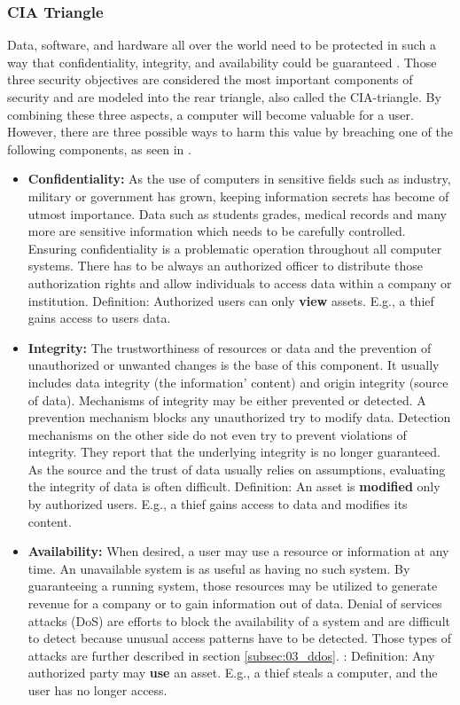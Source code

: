 \subsubsection{CIA Triangle}
Data, software, and hardware all over the world need to be protected in such a way that confidentiality, integrity, and availability could be guaranteed \cite{Pfleeger2014}. Those three security objectives are considered the most important components of security and are modeled into the rear triangle, also called the CIA-triangle. By combining these three aspects, a computer will become valuable for a user. However, there are three possible ways to harm this value by breaching one of the following components, as seen in \cite{Bishop2004}.
\begin{itemize}
  \item \textbf{Confidentiality:} As the use of computers in sensitive fields such as industry, military or government has grown, keeping information secrets has become of utmost importance. Data such as students grades, medical records and many more are sensitive information which needs to be carefully controlled. Ensuring confidentiality is a problematic operation throughout all computer systems. There has to be always an authorized officer to distribute those authorization rights and allow individuals to access data within a company or institution.
        \subitem Definition: Authorized users can only \textbf{view} assets. E.g., a thief gains access to users data.
  \item \textbf{Integrity:} The trustworthiness of resources or data and the prevention of unauthorized or unwanted changes is the base of this component. It usually includes data integrity (the information' content) and origin integrity (source of data). Mechanisms of integrity may be either prevented or detected. A prevention mechanism blocks any unauthorized try to modify data. Detection mechanisms on the other side do not even try to prevent violations of integrity. They report that the underlying integrity is no longer guaranteed. As the source and the trust of data usually relies on assumptions, evaluating the integrity of data is often difficult.
        \subitem Definition: An asset is \textbf{modified} only by authorized users. E.g., a thief gains access to data and modifies its content.
  \item \textbf{Availability:} When desired, a user may use a resource or information at any time. An unavailable system is as useful as having no such system. By guaranteeing a running system, those resources may be utilized to generate revenue for a company or to gain information out of data. Denial of services attacks (DoS) are efforts to block the availability of a system and are difficult to detect because unusual access patterns have to be detected. Those types of attacks are further described in section \ref{subsec:03_ddos}.
        \subitem:  Definition: Any authorized party may \textbf{use} an asset. E.g., a thief steals a computer, and the user has no longer access.
\end{itemize}

